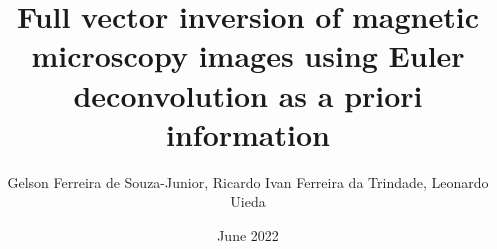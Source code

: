 \documentclass[manuscript,revised]{geophysics}
\begin{document}
\title{Full vector inversion of magnetic microscopy images using Euler deconvolution as a priori information}
\renewcommand{\thefootnote}{\fnsymbol{footnote}} 

\address{
\footnotemark[1]BP UTG, \\
200 Westlake Park Blvd, \\
Houston, TX, 77079 \\
\footnotemark[2]Bureau of Economic Geology, \\
John A. and Katherine G. Jackson School of Geosciences \\
The University of Texas at Austin \\
University Station, Box X \\
Austin, TX 78713-8924}

\author{Gelson Ferreira de Souza-Junior\footnotemark[1], Ricardo Ivan Ferreira da Trindade\footnotemark[1],  Leonardo Uieda\footnotemark[2]}
\date{June 2022}

\maketitle
\justify

%

\bigskip
















\end{document}
